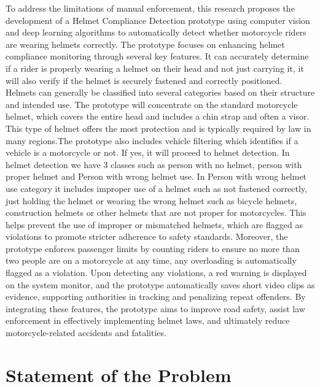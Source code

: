 \begin{refsection}
To address the limitations of manual enforcement, this research proposes the development of a Helmet Compliance Detection prototype using computer vision and deep learning algorithms to automatically detect whether motorcycle riders are wearing helmets correctly. The prototype focuses on enhancing helmet compliance monitoring through several key features. It can accurately determine if a rider is properly wearing a helmet on their head and not just carrying it,  it will  also verify if the helmet is securely fastened and correctly positioned.  Helmets can generally be classified into several categories based on their structure and intended use. The prototype will concentrate on the standard motorcycle helmet, which covers the entire head and includes a chin strap and often a visor. This type of helmet offers the most protection and is typically required by law in many regions.The prototype also includes vehicle filtering which identifies if a vehicle is a motorcycle or not. If yes, it will proceed to helmet detection. In helmet detection we have 3 classes such as person with no helmet, person with proper helmet and Person with wrong helmet use. In Person with wrong helmet use category it includes improper use of a helmet such as not fastened correctly, just holding the helmet or wearing the wrong helmet such as bicycle helmets, construction helmets or other helmets that are not proper for motorcycles. This helps prevent the use of improper or mismatched helmets, which are flagged as violations to promote stricter adherence to safety standards.
Moreover, the prototype enforces passenger limits by counting riders to ensure no more than two people are on a motorcycle at any time, any overloading is automatically flagged as a violation. Upon detecting any violations,  a red warning is displayed on the system monitor, and the prototype automatically saves short video clips as evidence, supporting authorities in tracking and penalizing repeat offenders. By integrating these features, the prototype aims to improve road safety, assist law enforcement in effectively implementing helmet laws, and ultimately reduce motorcycle-related accidents and fatalities.

\section{Statement of the Problem}


\end{refsection}
